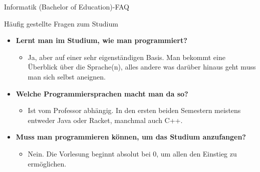 \begin{Huge}
	Informatik (Bachelor of Education)-FAQ
\end{Huge}
\begin{block}{Häufig gestellte Fragen zum Studium}
\begin{large}
	\begin{itemize}
		\item \textbf{Lernt man im Studium, wie man programmiert?}
\begin{itemize}
	\item Ja, aber auf einer sehr eigenständigen Basis. Man bekommt eine Überblick über die Sprache(n), alles andere was darüber hinaus geht muss man sich selbst aneignen.
\end{itemize}

\item \textbf{Welche Programmiersprachen macht man da so?}
\begin{itemize}
	\item Ist vom Professor abhängig. In den ersten beiden Semestern meistens entweder Java oder Racket, manchmal auch C++.
\end{itemize}

\item \textbf{Muss man programmieren können, um das Studium anzufangen?}
\begin{itemize}
	\item Nein. Die Vorlesung beginnt absolut bei 0, um allen den Einstieg zu ermöglichen.
\end{itemize}



\end{itemize}
\end{large}
\end{block}
